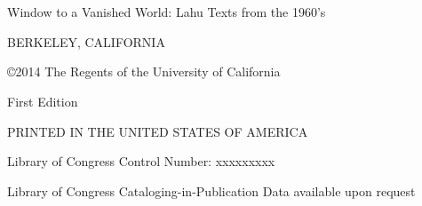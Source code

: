 \chapter*{}
\vspace{15em}
\thispagestyle{empty}
\begin{center}
Window to a Vanished World: Lahu Texts from the 1960’s

BERKELEY, CALIFORNIA

\copyright 2014 The Regents of the University of California

First Edition

PRINTED IN THE UNITED STATES OF AMERICA

Library of Congress Control Number:  xxxxxxxxx

Library of Congress Cataloging-in-Publication Data available upon request

\vspace{10em}
\date{Compiled on \today\ at \currenttime}
\end{center}



